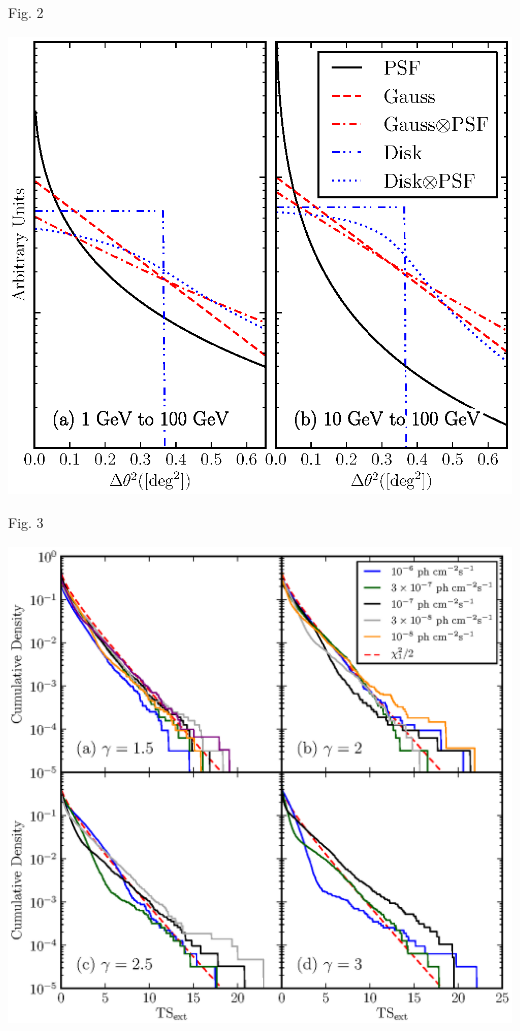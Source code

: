 \documentclass[12pt]{beamer}
\begin{document}
\begin{frame}{Fig. 2}
  \begin{center}
    \includegraphics[scale=0.5]{../paper/mc_plots/compare_disk_gauss_color.eps}
  \end{center}
\end{frame}

\begin{frame}{Fig. 3}
  \begin{center}
    \includegraphics[scale=0.5]{../paper/mc_plots/ts_ext_emin_1000_color.eps}
  \end{center}
\end{frame}
\end{document}
